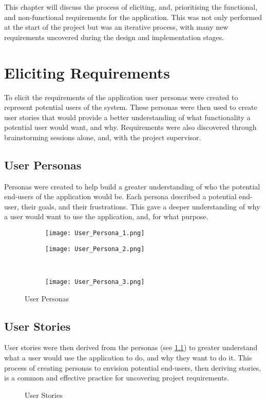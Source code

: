 This chapter will discuss the process of eliciting, and, prioritising the functional, and non-functional requirements for the application. This was not only performed at the start of the project but was an iterative process, with many new requirements uncovered during the design and implementation stages.
\section{Eliciting Requirements}
To elicit the requirements of the application user personas were created to represent potential users of the system. These personas were then used to create user stories that would provide a better understanding of what functionality a potential user would want, and why. Requirements were also discovered through brainstorming sessions alone, and, with the project supervisor.
\subsection{User Personas} \label{personas}
Personas were created to help build a greater understanding of who the potential end-users of the application would be. Each persona described a potential end-user, their goals, and their frustrations. This gave a deeper understanding of why a user would want to use the application, and, for what purpose.
\begin{figure}[!htbp]
    \centering
    \begin{subfigure}[b]{0.44\textwidth}
        \texttt{[image: User\_Persona\_1.png]}
    \end{subfigure}
    \hspace{0.5em}
    \begin{subfigure}[b]{0.44\textwidth}
        \texttt{[image: User\_Persona\_2.png]}
    \end{subfigure}
    \\[0.5ex]
    \begin{subfigure}[b]{0.44\textwidth}
        \texttt{[image: User\_Persona\_3.png]}
    \end{subfigure}
    \caption{User Personas}
    \label{fig:personas}
\end{figure}
\FloatBarrier
\subsection{User Stories}
User stories were then derived from the personas (see \ref{personas}) to greater understand what a user would use the application to do, and why they want to do it. This process of creating personas to envision potential end-users, then deriving stories, is a common and effective practice for uncovering project requirements. 
\begin{figure}[!htbp]
    \centering
    \begin{subfigure}[b]{0.90\textwidth}
    \end{subfigure}
    \caption{User Stories}
    \label{fig:stories}
\end{figure}
\FloatBarrier
